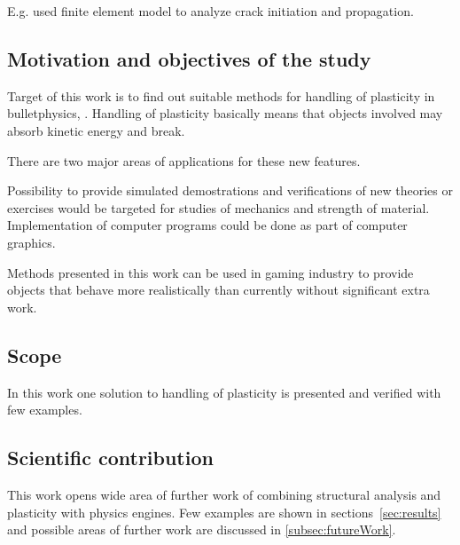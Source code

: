 E.g. \cite{Obrien:1999:GMA} used finite element model to analyze crack initiation and propagation.

\subsection{Motivation and objectives of the study}

Target of this work is to find out suitable methods for handling of plasticity in bulletphysics, \cite{bulletphysics}. 
Handling of plasticity basically means that objects involved may absorb kinetic energy and break. 

There are two major areas of applications for these new features.

Possibility to provide simulated demostrations and verifications of new theories or exercises  would be targeted for 
studies of mechanics and strength of material. Implementation of computer programs could be done as part of computer graphics.
 
Methods presented in this work can be used in gaming industry to provide objects that behave more realistically than currently without significant extra work.

\subsection{Scope}

In this work one solution to handling of plasticity is presented and verified with few examples.

\subsection{Scientific contribution}

This work opens wide area of further work of combining structural analysis and plasticity with physics engines.
Few examples are shown in sections~\ref{sec:results} and possible areas of further work are discussed in \ref{subsec:futureWork}.

\cleardoublepage
